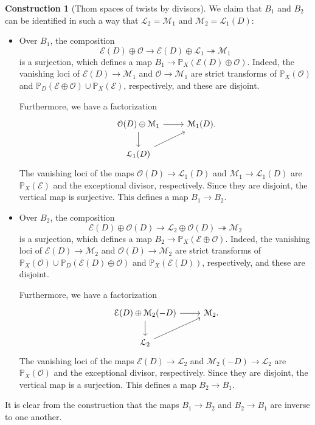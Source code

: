 \documentclass{amsart}
\numberwithin{equation}{section}
\theoremstyle{plain}
\theoremstyle{definition}
\newtheorem{construction}[equation]{Construction}
\let\scr=\mathcal
\let\bb=\mathbb
\def\P{\bb P}
\let\onto=\twoheadrightarrow
\begin{document}
\begin{construction}[Thom spaces of twists by divisors]
We claim that $B_1$ and $B_2$ can be identified in such a way that $\scr L_2=\scr M_1$ and $\scr M_2=\scr L_1(D)$:
\begin{itemize}
\item Over $B_1$, the composition
\begin{equation*}\label{eq:thomtwistsurj1}
\scr E (D) \oplus \scr O \to \scr E (D) \oplus \scr L_1 \onto \scr M_1
\end{equation*}
is a surjection, which defines a map $B_1\to\P_X(\scr E(D) \oplus \scr O)$. Indeed, the vanishing loci of $\scr E (D) \to \scr M_1$ and $\scr O \to \scr M_1$ are strict transforms of $\P_X(\scr O)$ and $\P_D(\scr E \oplus \scr O) \cup \P_X(\scr E )$, respectively, and these are disjoint.

Furthermore, we have a factorization
\[
\begin{tikzcd}
\scr O (D) \oplus \scr M_1 \arrow[r] \arrow[d]& \scr M_1(D)\rlap. \\
\scr L_1(D) \arrow[ur]&
\end{tikzcd}
\]
The vanishing loci of the maps $\scr O (D) \to \scr L_1(D)$ and $\scr M_1 \to \scr L_1(D)$ are $\P_X(\scr E)$ and the exceptional divisor, respectively. Since they are disjoint, the vertical map is surjective. This defines a map $B_1\to B_2$.

\item Over $B_2$, the composition
\begin{equation*}\label{eq:thomtwistsurj2}
\scr E(D) \oplus \scr O(D) \to \scr L_2 \oplus \scr O(D) \onto \scr M_2
\end{equation*}
is a surjection, which defines a map $B_2 \to \P_X(\scr E \oplus \scr O)$.
Indeed, the vanishing loci of $\scr E(D) \to \scr M_2$ and $\scr O(D) \to \scr M_2$ are strict transforms of $\P_X(\scr O)\cup\P_D(\scr E(D) \oplus \scr O)$ and $\P_X(\scr E(D))$, respectively, and these are disjoint.

Furthermore, we have a factorization
\[
\begin{tikzcd}
\scr E (D) \oplus \scr M_2(-D) \arrow[r] \arrow[d]& \scr M_2\rlap. \\
\scr L_2 \arrow[ur]&
\end{tikzcd}
\]
The vanishing loci of the maps $\scr E (D) \to \scr L_2$ and $\scr M_2(-D)\to\scr L_2$ are $\P_X(\scr O)$ and the exceptional divisor, respectively. Since they are disjoint, the vertical map is a surjection. This defines a map $B_2 \to B_1$. 
\end{itemize}
It is clear from the construction that the maps $B_1\to B_2$ and $B_2\to B_1$ are inverse to one another. 


\end{construction}
\end{document}
